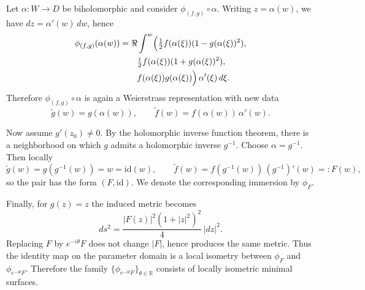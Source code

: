 \begin{solution}
Let $\alpha:W\to D$ be biholomorphic and consider $\phi_{(f,g)}\circ\alpha$. Writing $z=\alpha(w)$, we have
$dz=\alpha'(w)\,dw$, hence
\[
\begin{aligned}
\phi_{(f,g)}(\alpha(w))
&=\Re\int^w \Bigl(
\tfrac12 f(\alpha(\xi))(1-g(\alpha(\xi))^2),\\
&\qquad \tfrac{i}{2}f(\alpha(\xi))(1+g(\alpha(\xi))^2),\\
&\qquad f(\alpha(\xi))g(\alpha(\xi))\Bigr)
\,\alpha'(\xi)\,d\xi.
\end{aligned}
\]
Therefore $\phi_{(f,g)}\circ\alpha$ is again a Weierstrass representation with new data
\[
\tilde g(w)=g(\alpha(w)),\qquad
\tilde f(w)=f(\alpha(w))\,\alpha'(w).
\]

Now assume $g'(z_0)\neq 0$. By the holomorphic inverse function theorem, there is a neighborhood on which $g$ admits a
holomorphic inverse $g^{-1}$. Choose $\alpha=g^{-1}$. Then locally
\[
\tilde g(w)=g(g^{-1}(w))=w=\mathrm{id}(w),
\qquad
\tilde f(w)= f(g^{-1}(w))\,(g^{-1})'(w)=:F(w),
\]
so the pair has the form $(F,\mathrm{id})$. We denote the corresponding immersion by $\phi_F$.

Finally, for $g(z)=z$ the induced metric becomes
\[
ds^2=\frac{|F(z)|^2(1+|z|^2)^2}{4}\,|dz|^2.
\]
Replacing $F$ by $e^{-i\theta}F$ does not change $|F|$, hence produces the same metric. Thus the identity map on the
parameter domain is a local isometry between $\phi_F$ and $\phi_{e^{-i\theta}F}$. Therefore the family
$\{\phi_{e^{-i\theta}F}\}_{\theta\in\mathbb{R}}$ consists of locally isometric minimal surfaces.

\medskip
\end{solution}

